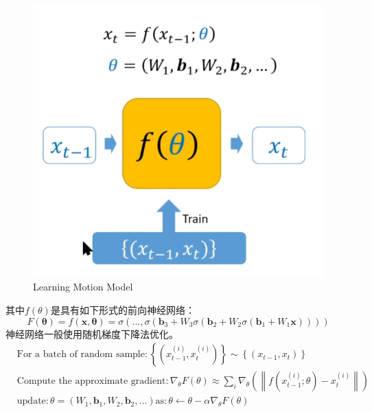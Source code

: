 \documentclass[lang=cn,newtx,10pt,scheme=chinese]{elegantbook}
\begin{document}
\begin{figure}[htbp]
  \centering
  \includegraphics[totalheight=2in]{"./image/LearningMotionModel.png"}
  \caption{Learning Motion Model} 
  \label{fig:LearningMotionModel}
\end{figure}
其中$f(\theta)$是具有如下形式的前向神经网络：
\begin{equation}
  F(\boldsymbol{\theta})=f(\boldsymbol{x, \theta})=\sigma\left(\dots, \sigma\left(\boldsymbol{b}_3+W_3 \sigma\left(\boldsymbol{b}_2+W_2 
  \sigma\left(\boldsymbol{b}_1+W_1 \boldsymbol{x}\right)\right)\right)\right)
\end{equation}
神经网络一般使用随机梯度下降法优化。
\begin{equation}
  \begin{aligned}
    &\text{For a batch of random sample}:\left\{\left(x_{t-1}^{(i)}, x_t^{(i)}\right)\right\} \sim
   \left\{\left(x_{t-1}, x_t\right)\right\} \\
   & \text{Compute the approximate gradient}: \nabla_\theta F(\theta) \approx \sum_i \nabla_\theta\left(\left\|f\left(x_{t-1}^{(i)} ; \theta\right)-x_t^{(i)}\right\|\right)\\
  & \text{update}: \theta=\left(W_1, \boldsymbol{b}_1, W_2, \boldsymbol{b}_2, \ldots\right) \text{as}:
  \theta \leftarrow \theta-\alpha \nabla_\theta F(\theta)
  \end{aligned}
\end{equation}
\end{document}
